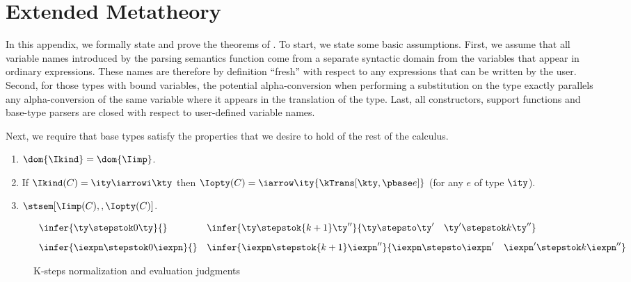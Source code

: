 \appendix
\section{Extended Metatheory}
\label{app:ddc-meta-theory}
In this appendix, we formally state and prove the theorems
of . To start, we state some basic
assumptions.  First, we assume that all variable names
introduced by the parsing semantics function come from a separate
syntactic domain from the variables that appear in ordinary
expressions. These names are therefore by definition ``fresh'' with respect
to any expressions that can be written by the user.  Second, for those
types with bound variables, the potential alpha-conversion when
performing a substitution on the type exactly parallels any
alpha-conversion of the same variable where it appears in the
translation of the type. Last, all constructors, support functions and
base-type parsers are closed with respect to user-defined variable
names.

Next, we require that \ddc{} base types satisfy the properties that we
desire to hold of the rest of the calculus. 

\begin{condition}
\label{cond:base-types}
  \begin{enumerate}
  \item $\dom {\Ikind} = \dom {\Iimp}$.
  \item If $\Ikind(C) = {\ity \iarrowi \kty}$ then $\Iopty(C) =
    \iarrow \ity {\kTrans[\kty,\pbase e]}$ (for any $e$ of type $\ity$).
  \item $\stsem[\Iimp(C),,\Iopty(C)]$.
    \label{cond:closed-op}
  \end{enumerate}
\end{condition}

\begin{figure}[t]
\[ 
\begin{array}{ll}
  \infer{\ty \stepstok 0 \ty}{} \qquad
  &
  \infer{\ty \stepstok {k+1} \ty''}
  {\ty \stepsto \ty' \quad \ty' \stepstok k \ty''}
\\[2ex]
  \infer{\iexpn \stepstok 0 \iexpn}{} 
&
 \infer{\iexpn \stepstok {k+1} \iexpn''}
  {\iexpn \stepsto \iexpn' \quad \iexpn' \stepstok k \iexpn''}
\end{array}
\]
\caption{K-steps normalization and evaluation judgments}
\label{fig:k-steps-norm-eval}
\end{figure}

